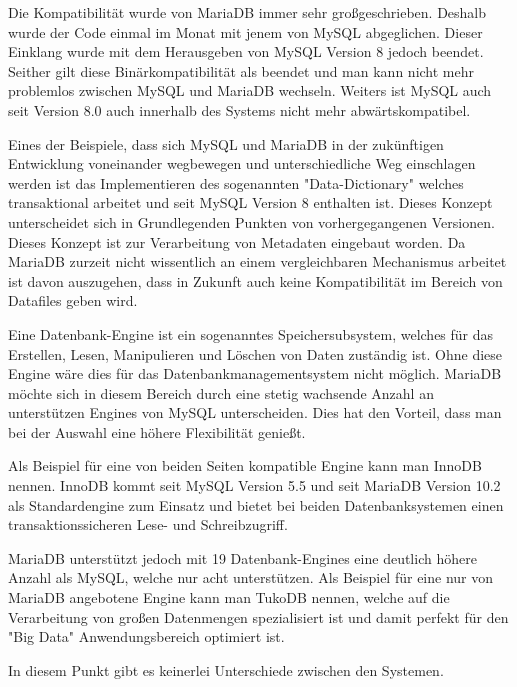 Die Kompatibilität wurde von MariaDB immer sehr großgeschrieben. Deshalb wurde der Code einmal im Monat mit jenem von MySQL abgeglichen. Dieser Einklang wurde mit dem Herausgeben von MySQL Version 8 jedoch beendet. Seither gilt diese Binärkompatibilität als beendet und man kann nicht mehr problemlos zwischen MySQL und MariaDB wechseln. Weiters ist MySQL auch seit Version 8.0 auch innerhalb des Systems nicht mehr abwärtskompatibel. \cite{MariaVsMy}

Eines der Beispiele, dass sich MySQL und MariaDB in der zukünftigen Entwicklung voneinander wegbewegen und unterschiedliche Weg einschlagen werden ist das Implementieren des sogenannten "Data-Dictionary" welches transaktional arbeitet und seit MySQL Version 8 enthalten ist. Dieses Konzept unterscheidet sich in Grundlegenden Punkten von vorhergegangenen Versionen. Dieses Konzept ist zur  Verarbeitung von Metadaten eingebaut worden. Da MariaDB zurzeit nicht wissentlich an einem vergleichbaren Mechanismus arbeitet ist davon auszugehen, dass in Zukunft auch keine Kompatibilität im Bereich von Datafiles geben wird. \cite{MariaVsMy}

 \label{sec:dbEngine}

Eine Datenbank-Engine ist ein sogenanntes Speichersubsystem, welches für das Erstellen, Lesen, Manipulieren und Löschen von Daten zuständig ist. Ohne diese Engine wäre dies für das Datenbankmanagementsystem nicht möglich.
MariaDB möchte sich in diesem Bereich durch eine stetig wachsende Anzahl an unterstützen Engines von MySQL unterscheiden. Dies hat den Vorteil, dass man bei der Auswahl eine höhere Flexibilität genießt. \cite{MariaVsMy}

Als Beispiel für eine von beiden Seiten kompatible Engine kann man InnoDB nennen. InnoDB kommt seit MySQL Version 5.5 und seit MariaDB Version 10.2 als Standardengine zum Einsatz und bietet bei beiden Datenbanksystemen einen transaktionssicheren Lese- und Schreibzugriff. \cite{MariaVsMy}

MariaDB unterstützt jedoch mit 19 Datenbank-Engines eine deutlich höhere Anzahl als MySQL, welche nur acht unterstützen. Als Beispiel für eine nur von MariaDB angebotene Engine kann man TukoDB nennen, welche auf die Verarbeitung von großen Datenmengen spezialisiert ist und damit perfekt für den "Big Data" Anwendungsbereich optimiert ist. \cite{MariaVsMy}


In diesem Punkt gibt es keinerlei Unterschiede zwischen den Systemen. \cite{MariaVsMy}

